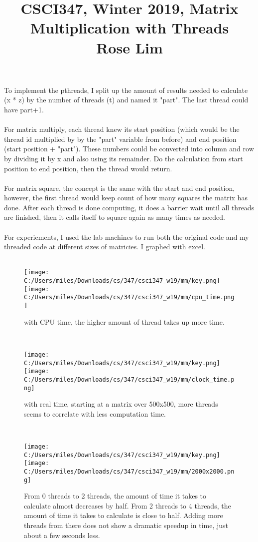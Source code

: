 \documentclass[11pt]{article}
\begin{document}
\title{CSCI347, Winter 2019, Matrix Multiplication with Threads\\Rose Lim}
\maketitle

To implement the pthreads, I split up the amount of results needed to calculate (x * z) by the number of threads (t) and named it "part". 
The last thread could have part+1.
\\ 
\\
For matrix multiply, each thread knew its start position (which would be the thread id multiplied by by the "part" variable from before) and end position (start position + "part"). 
These numbers could be converted into column and row by dividing it by x and also using its remainder. 
Do the calculation from start position to end position, then the thread would return. 
\\
\\
For matrix square, the concept is the same with the start and end position, however, the first thread would keep count of how many squares the matrix has done. 
After each thread is done computing, it does a barrier wait until all threads are finished, then it calls itself to square again as many times as needed.
\\
\\
For experiements, I used the lab machines to run both the original code and my threaded code at different sizes of matricies. I graphed with excel. 
\\
\\
\begin{figure}[htbp]
\texttt{[image: C:/Users/miles/Downloads/cs/347/csci347\_w19/mm/key.png]}
\texttt{[image: C:/Users/miles/Downloads/cs/347/csci347\_w19/mm/cpu\_time.png]}
\caption{with CPU time, the higher amount of thread takes up more time.}
\end{figure}
\\
\begin{figure}[htbp]
\texttt{[image: C:/Users/miles/Downloads/cs/347/csci347\_w19/mm/key.png]}
\texttt{[image: C:/Users/miles/Downloads/cs/347/csci347\_w19/mm/clock\_time.png]}
\caption{with real time, starting at a matrix over 500x500, more threads seems to correlate with less computation time.}
\end{figure}
\\
\begin{figure}[htbp]
\texttt{[image: C:/Users/miles/Downloads/cs/347/csci347\_w19/mm/key.png]}
\texttt{[image: C:/Users/miles/Downloads/cs/347/csci347\_w19/mm/2000x2000.png]}
\caption{From 0 threads to 2 threads, the amount of time it takes to calculate almost decreases by half. From 2 threads to 4 threads, the amount of time it takes to calculate is close to half. Adding more threads from there does not show a dramatic speedup in time, just about a few seconds less.}
\end{figure}
\end{document}
